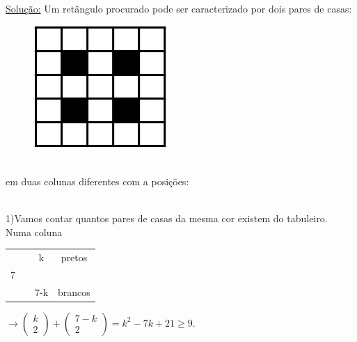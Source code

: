 \documentclass[a4paper,12pt]{article}
\renewcommand{\geq}{\ensuremath{\geqslant}}
\theoremstyle{plain} %
\theoremstyle{definition} %
\theoremstyle{remark} %
\begin{document}
	\begin{framed}
		\underline{Solu\c{c}\~ao:} Um ret\^angulo procurado pode ser caracterizado por dois pares de casas: 
		
		\begin{figure}
			\includegraphics[width=0.9\linewidth]{1 page 9.png}
		\end{figure} \, \\
		
		\vspace{1ex} em duas colunas diferentes com a posi\c{c}\=oes:
		
		\, \\
		
		1)Vamos contar quantos pares de casas da mesma cor existem do tabuleiro. Numa coluna
		
		\begin{center}
			\begin{tabular}{c|c|cc}
				\cline{2-2}
				& \hspace{2ex} & k   & pretos  \\
				7 & \hspace{2ex} &     &         \\
				& \hspace{2ex} & 7-k & brancos \\ \cline{2-2}
			\end{tabular} $\rightarrow \left(\begin{smallmatrix}
				k\\
				2
			\end{smallmatrix}\right)+\left(\begin{smallmatrix}
				7-k\\
				2
			\end{smallmatrix}\right)=k^2-7k+21\geq 9$.
		\end{center}
		

\end{framed}
\end{document}
